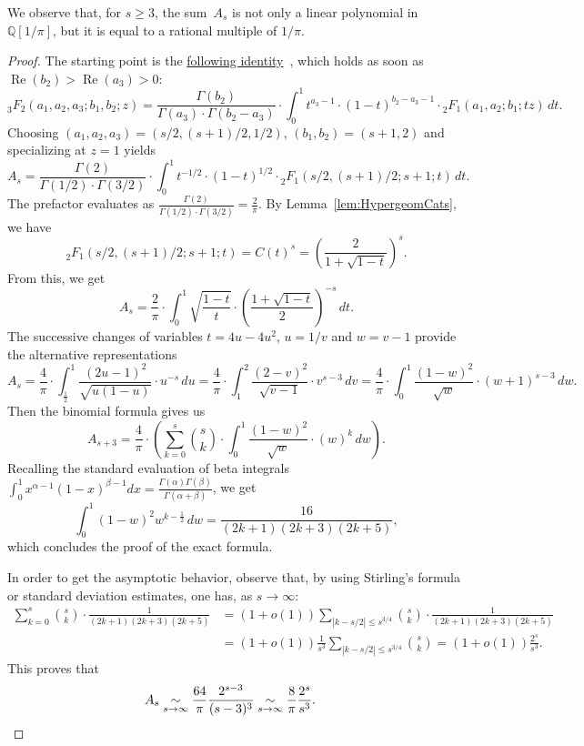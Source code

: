 \documentclass[12pt]{amsart}
\theoremstyle{plain}
\theoremstyle{remark}
\renewcommand\Re{\operatorname{Re}}
\def\Q{\mathbb{Q}}
\def\Q{\mathbb{Q}}
\begin{document}
We observe that, for $s\geq 3$, the sum~$A_{s}$ is not only a linear polynomial in $\Q[1/\pi]$, but it is equal to a rational multiple of $1/\pi$.

\begin{proof}
The starting point is the \href{https://functions.wolfram.com/HypergeometricFunctions/Hypergeometric3F2/07/01/01/0001/}{following identity}~\cite[Eq.~(4.1.2), page 108]{Slater66}, which holds as soon as $\Re(b_2) > \Re(a_3) > 0$:
\[
 {}_{3}^{}{{}{{}{F_{2}^{}}}} \left(a_1, a_2, a_3; b_1, b_2; z \right)
 =
\frac{\Gamma(b_2)}{\Gamma(a_3) \cdot \Gamma(b_2-a_3)}
\cdot \int_0^1 t^{a_3-1} \cdot (1-t)^{b_2-a_3-1} \cdot 
 {}_{2}^{}{{}{{}{F_{1}^{}}}} \left(a_1, a_2; b_1; tz \right) \, dt
. 
\]
Choosing $(a_1, a_2, a_3) = (s/2, (s+1)/2, 1/2)$, $(b_1, b_2) = (s+1, 2)$ and specializing at $z=1$ yields
\[
A_s
 =
\frac{\Gamma(2)}{\Gamma(1/2) \cdot \Gamma(3/2)}
\cdot \int_0^1 t^{-1/2} \cdot (1-t)^{1/2} \cdot 
 {}_{2}^{}{{}{{}{F_{1}^{}}}} \left(s/2, (s+1)/2; s+1; t \right) \, dt .
\]
The prefactor evaluates as $\frac{\Gamma(2)}{\Gamma(1/2) \cdot \Gamma(3/2)}=\frac2{\pi}$.
By Lemma~\ref{lem:HypergeomCats}, we have
\[{}_{2}^{}{{}{{}{F_{1}^{}}}} \left(s/2, (s+1)/2; s+1; t \right)= C(t)^s=\left( \frac2{1 + \sqrt{1-t}}\right)^{s}.\] 
From this, we get
\[
A_s
 =
\frac{2}{\pi}
\cdot \int_0^1 \sqrt{\frac{1-t}{t}} \cdot 
\left( \frac{1 + \sqrt{1-t}}{2}\right)^{-s}
 \, dt .
\]
The successive changes of variables $t=4u - 4u^2$, $u = 1/v$ and $w=v-1$ provide the alternative representations
\[
A_s
 =
\frac{4}{\pi}
\cdot \int_{\frac12}^1 \frac{(2u-1)^2}{\sqrt{u (1-u)}} \cdot u^{-s} \, du 
 =
\frac{4}{\pi}
\cdot \int_{1}^2 \frac{(2-v)^2}{\sqrt{v-1}} \cdot v^{s-3} \, dv 
 =
\frac{4}{\pi}
\cdot \int_{0}^1 \frac{(1-w)^2}{\sqrt{w}} \cdot (w+1)^{s-3} \, dw .
\]
Then the binomial formula gives us
\[A_{s+3}=\frac{4}{\pi} \cdot \left(
\sum_{k=0}^s   {\binom{s}{k}} \cdot \int_{0}^1 \frac{(1-w)^2}{\sqrt{w}} \cdot (w)^{k} \, dw \right).\]
Recalling the standard evaluation of beta integrals $\int_0^1 x^{\alpha-1} (1-x)^{\beta-1}dx=\frac{\Gamma(\alpha)\Gamma(\beta)}{\Gamma(\alpha+\beta)}$, we get
\[
\int_{0}^{1} \left(1-w \right)^{2} w^{k -\frac{1}{2}} \, dw
 = 
\frac{16}{\left(2 k +1\right) \left(2 k +3\right) \left(2 k +5\right)},
\]
which concludes the proof of the exact formula.

In order to get the asymptotic behavior, observe that, by using Stirling's formula
or standard deviation estimates, one has, as $s \rightarrow \infty$:
\begin{align*}
\sum_{k=0}^s \binom{s}{k} \cdot \frac{1}{(2k+1)(2k+3)(2k+5)} &= (1+o(1)) \sum_{|k-s/2| \leq s^{3/4}} \binom{s}{k} \cdot \frac{1}{(2k+1)(2k+3)(2k+5)}\\
&= (1+o(1)) \frac{1}{s^3} \sum_{|k-s/2| \leq s^{3/4}} \binom{s}{k}
 = (1+o(1)) \frac{2^s}{s^3}.
\end{align*}
This proves that
\begin{align*}
A_s &\underset{s \rightarrow \infty}{\sim} \frac{64}{\pi} \frac{2^{s-3}}{(s-3)^3} 
\underset{s \rightarrow \infty}{\sim} \frac{8}{\pi} \frac{2^s}{s^3}.\qedhere
\end{align*}
\end{proof}
\end{document}
